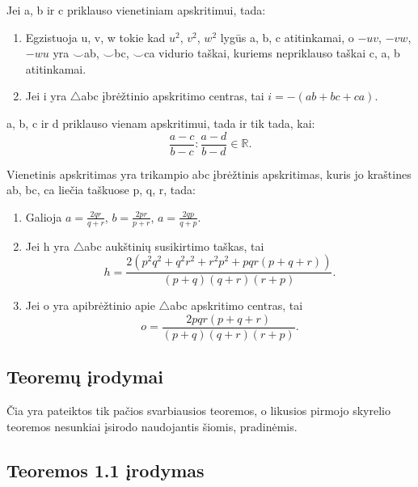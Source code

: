 \begin{thmnr} Jei a, b ir c priklauso vienetiniam apskritimui, tada:\
\begin{enumerate}
\item Egzistuoja u, v, w tokie kad $u^2$, $v^2$, $w^2$ lygūs a, b, c atitinkamai, o $-uv$, $-vw$, $-wu$ yra $\smile$ab, $\smile$bc, $\smile$ca vidurio taškai, kuriems nepriklauso taškai c, a, b atitinkamai.
\item Jei i yra $\bigtriangleup$abc įbrėžtinio apskritimo centras, tai $i= - (ab + bc + ca)$.
\end{enumerate}
\end{thmnr}

\begin{thmnr} a, b, c ir d priklauso vienam apskritimui, tada ir tik tada, kai: 
$$\frac{a - c}{b - c}:\frac{a-d}{b-d}\in\mathbb{R}.$$
\end{thmnr}

\begin{thmnr} Vienetinis apskritimas yra trikampio abc įbrėžtinis apskritimas, kuris jo kraštines ab, bc, ca liečia taškuose p, q, r, tada:\
\begin{enumerate}
\item Galioja $a=\frac{2qr}{q + r}$, $b=\frac{2pr}{p + r}$, $a=\frac{2qp}{q + p}$.
\item Jei h yra $\bigtriangleup$abc aukštinių susikirtimo taškas, tai
\begin{equation*}
h=\frac{2(p^2q^2 + q^2r^2 + r^2p^2 + pqr(p + q+ r))}{(p+q)(q+r)(r+p)}.
\end{equation*}
\item Jei o yra apibrėžtinio apie  $\bigtriangleup$abc apskritimo centras, tai
\[o=\frac{2pqr(p+q+r)}{(p+q)(q+r)(r+p)}.\]
\end{enumerate}
\end{thmnr}

\subsection{Teoremų įrodymai}
Čia yra pateiktos tik pačios svarbiausios teoremos, 
o likusios pirmojo skyrelio teoremos nesunkiai įsirodo
naudojantis šiomis, pradinėmis.
  
\subsection*{Teoremos 1.1 įrodymas}

